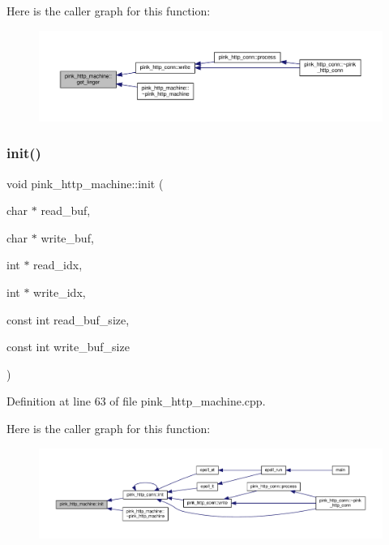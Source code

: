 Here is the caller graph for this function\+:
\nopagebreak
\begin{figure}[H]
\begin{center}
\leavevmode
\includegraphics[width=350pt]{classpink__http__machine_a01dcf59a537c21d5a4a92c1c25fbf3ab_icgraph}
\end{center}
\end{figure}
\mbox{\label{classpink__http__machine_a32b0ee47de1b90467d17194fa83b4eb0}} 
\subsubsection{\texorpdfstring{init()}{init()}}
{\footnotesize\ttfamily void pink\+\_\+http\+\_\+machine\+::init (\begin{DoxyParamCaption}\item[{char $\ast$}]{read\+\_\+buf,  }\item[{char $\ast$}]{write\+\_\+buf,  }\item[{int $\ast$}]{read\+\_\+idx,  }\item[{int $\ast$}]{write\+\_\+idx,  }\item[{const int}]{read\+\_\+buf\+\_\+size,  }\item[{const int}]{write\+\_\+buf\+\_\+size }\end{DoxyParamCaption})}



Definition at line 63 of file pink\+\_\+http\+\_\+machine.\+cpp.

Here is the caller graph for this function\+:
\nopagebreak
\begin{figure}[H]
\begin{center}
\leavevmode
\includegraphics[width=350pt]{classpink__http__machine_a32b0ee47de1b90467d17194fa83b4eb0_icgraph}
\end{center}
\end{figure}
\mbox{\label{classpink__http__machine_ad6d404392628f4b2c94a4b30fefb62f8}} 
